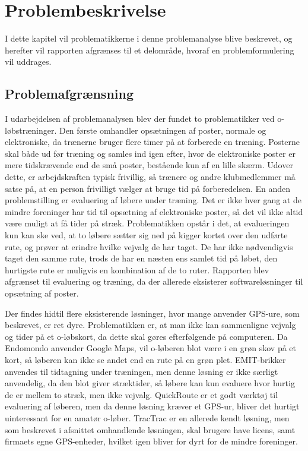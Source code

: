 \chapter{Problembeskrivelse}
I dette kapitel vil problematikkerne i denne problemanalyse blive beskrevet, og herefter vil rapporten afgrænses til et delområde, hvoraf en problemformulering vil uddrages.

\section{Problemafgrænsning}
I udarbejdelsen af problemanalysen blev der fundet to problematikker ved o-løbstræninger. Den første omhandler opsætningen af poster, normale og elektroniske, da trænerne bruger flere timer på at forberede en træning. Posterne skal både ud før træning og samles ind igen efter, hvor de elektroniske poster er mere tidskrævende end de små poster, bestående kun af en lille skærm. Udover dette, er arbejdskraften typisk frivillig, så trænere og andre klubmedlemmer må satse på, at en person frivilligt vælger at bruge tid på forberedelsen. En anden problemstilling er evaluering af løbere under træning. Det er ikke hver gang at de mindre foreninger har tid til opsætning af elektroniske poster, så det vil ikke altid være muligt at få tider på stræk. Problematikken opstår i det, at evalueringen kun kan ske ved, at to løbere sætter sig ned på kigger kortet over den udførte rute, og prøver at erindre hvilke vejvalg de har taget. De har ikke nødvendigvis taget den samme rute, trods de har en næsten ens samlet tid på løbet, den hurtigste rute er muligvis en kombination af de to ruter. Rapporten blev afgrænset til evaluering og træning, da der allerede eksisterer softwareløsninger til opsætning af poster.

Der findes hidtil flere eksisterende løsninger, hvor mange anvender GPS-ure, som beskrevet, er ret dyre. Problematikken er, at man ikke kan sammenligne vejvalg og tider på et o-løbskort, da dette skal gøres efterfølgende på computeren. Da Endomondo anvender Google Maps, vil o-løberen blot være i en grøn skov på et kort, så løberen kan ikke se andet end en rute på en grøn plet. EMIT-brikker anvendes til tidtagning under træningen, men denne løsning er ikke særligt anvendelig, da den blot giver stræktider, så løbere kan kun evaluere hvor hurtig de er mellem to stræk, men ikke vejvalg. QuickRoute er et godt værktøj til evaluering af løberen, men da denne løsning kræver et GPS-ur, bliver det hurtigt uinteressant for en amatør o-løber.
TracTrac er en allerede kendt løsning, men som beskrevet i afsnittet omhandlende løsningen, skal brugere have licens, samt firmaets egne GPS-enheder, hvilket igen bliver for dyrt for de mindre foreninger.

